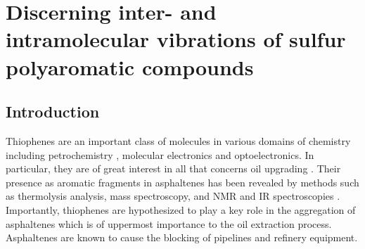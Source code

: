 \chapter[Discerning inter- and intramolecular vibrations]{Discerning inter- and intramolecular vibrations of sulfur polyaromatic compounds}
\minitoc
\restoregeometry

	\newpage
	
	\section{Introduction}
	
	Thiophenes are an important class of molecules in various domains of chemistry including petrochemistry \cite{waldo1991sulfur,mitra1998determination,lobodin2015separation},  molecular electronics \cite{katz2004recent,ong2008thiophene,vivas2011linear,silva2011controlling} and optoelectronics\cite{kim2010one}. In particular, they are of great interest in all that concerns oil upgrading \cite{kishita2003upgrading,samokhvalov2011heterogeneous,chen2015acylation}. Their presence as aromatic fragments in asphaltenes has been revealed by methods such as thermolysis analysis\cite{strausz1992molecular}, mass spectroscopy,\cite{liu2010molecular,karimi2011quantitative}  and NMR and IR spectroscopies \cite{coelho2012elucidation,alhumaidan2016impact}. Importantly, thiophenes are hypothesized to play a key role in the aggregation of asphaltenes \cite{widany2001electronic,liu2014adjusting} which is of uppermost importance to the oil extraction process. Asphaltenes are known to cause the blocking of pipelines and refinery equipment.\\
	
